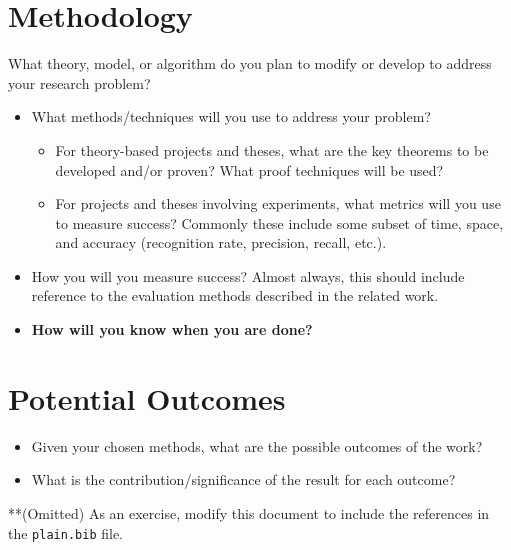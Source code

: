 \documentclass[11pt]{artikel3}
\begin{document}
\section{Methodology}

What theory, model, or algorithm do you plan to modify or develop to address your research problem?
\begin{itemize}
\item What methods/techniques will you use to address your problem? 
\begin{itemize}
\item For theory-based projects and theses, what are the key theorems to be developed and/or proven? What proof techniques will be used?
\item For projects and theses involving experiments, what metrics
will you use to measure success? Commonly these include some subset of time, space, and accuracy (recognition rate, precision, recall, etc.).
\end{itemize}

\item How you will you measure success? Almost always, this should include reference to the evaluation methods described in the related work.

\item {\bf How will you know when you are done?}
\end{itemize}

\section{Potential Outcomes}

\begin{itemize}
\item Given your chosen methods, what are the possible outcomes of the work? 
\item What is the contribution/significance of the result for each outcome? 
\end{itemize}




**(Omitted) As an exercise, modify this document to include the references in the {\tt plain.bib} file.
\end{document}
